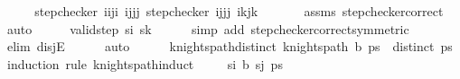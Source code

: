 \begin{isabellebody}
\ \ \isamarkupfalse%
\ \isamarkupfalse%
\ {\isachardoublequoteopen}step{\isacharunderscore}{\kern0pt}checker\ {\isacharparenleft}{\kern0pt}i\isactrlsub i{\isacharcomma}{\kern0pt}j\isactrlsub i{\isacharparenright}{\kern0pt}\ {\isacharparenleft}{\kern0pt}i\isactrlsub j{\isacharcomma}{\kern0pt}j\isactrlsub j{\isacharparenright}{\kern0pt}{\isachardoublequoteclose}\ {\isachardoublequoteopen}step{\isacharunderscore}{\kern0pt}checker\ {\isacharparenleft}{\kern0pt}i\isactrlsub j{\isacharcomma}{\kern0pt}j\isactrlsub j{\isacharparenright}{\kern0pt}\ {\isacharparenleft}{\kern0pt}i\isactrlsub k{\isacharcomma}{\kern0pt}j\isactrlsub k{\isacharparenright}{\kern0pt}{\isachardoublequoteclose}\ \isanewline
\ \ \ \ \isamarkupfalse%
\ assms\ step{\isacharunderscore}{\kern0pt}checker{\isacharunderscore}{\kern0pt}correct\ \isamarkupfalse%
\ auto\isanewline
\ \ \isamarkupfalse%
\ \isamarkupfalse%
\ {\isachardoublequoteopen}{\isasymnot}valid{\isacharunderscore}{\kern0pt}step\ s\isactrlsub i\ s\isactrlsub k{\isachardoublequoteclose}\isanewline
\ \ \ \ \isamarkupfalse%
\ {\isacharparenleft}{\kern0pt}simp\ add{\isacharcolon}{\kern0pt}\ step{\isacharunderscore}{\kern0pt}checker{\isacharunderscore}{\kern0pt}correct{\isacharbrackleft}{\kern0pt}symmetric{\isacharbrackright}{\kern0pt}{\isacharparenright}{\kern0pt}\isanewline
\ \ \ \ \isamarkupfalse%
\ {\isacharparenleft}{\kern0pt}elim\ disjE{\isacharparenright}{\kern0pt}\isanewline
\ \ \ \ \isamarkupfalse%
\ auto\isanewline
\ \ \ \ \isamarkupfalse%
\isanewline
{}\isamarkupfalse%
%
\endisatagproof
{\isafoldproof}%
%
\isadelimproof
\isanewline
%
\endisadelimproof
\isanewline
{}\isamarkupfalse%
\ knights{\isacharunderscore}{\kern0pt}path{\isacharunderscore}{\kern0pt}distinct{\isacharcolon}{\kern0pt}\ {\isachardoublequoteopen}knights{\isacharunderscore}{\kern0pt}path\ b\ ps\ {\isasymLongrightarrow}\ distinct\ ps{\isachardoublequoteclose}\isanewline
%
\isadelimproof
%
\endisadelimproof
%
\isatagproof
{}\isamarkupfalse%
\ {\isacharparenleft}{\kern0pt}induction\ rule{\isacharcolon}{\kern0pt}\ knights{\isacharunderscore}{\kern0pt}path{\isachardot}{\kern0pt}induct{\isacharparenright}{\kern0pt}\isanewline
\ \ \isamarkupfalse%
\ {\isacharparenleft}{\kern0pt}{}\ s\isactrlsub i\ b\ s\isactrlsub j\ ps{\isacharparenright}{\kern0pt}\isanewline
\ \ \isamarkupfalse%
\ \isamarkupfalse%

\end{isabellebody}
